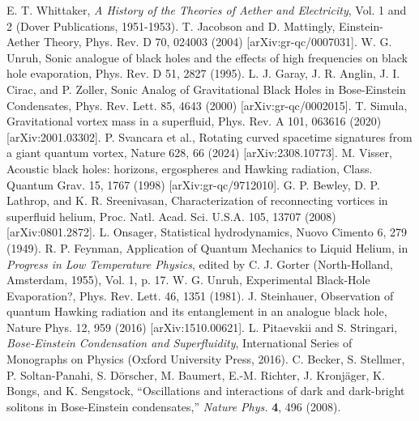 \documentclass{article}
\begin{document}
\begin{thebibliography}{}
 E. T. Whittaker, \emph{A History of the Theories of Aether and Electricity}, Vol. 1 and 2 (Dover Publications, 1951-1953).
 T. Jacobson and D. Mattingly, Einstein-Aether Theory, Phys. Rev. D 70, 024003 (2004) [arXiv:gr-qc/0007031].
 W. G. Unruh, Sonic analogue of black holes and the effects of high frequencies on black hole evaporation, Phys. Rev. D 51, 2827 (1995).
 L. J. Garay, J. R. Anglin, J. I. Cirac, and P. Zoller, Sonic Analog of Gravitational Black Holes in Bose-Einstein Condensates, Phys. Rev. Lett. 85, 4643 (2000) [arXiv:gr-qc/0002015].
 T. Simula, Gravitational vortex mass in a superfluid, Phys. Rev. A 101, 063616 (2020) [arXiv:2001.03302].
 P. Svancara et al., Rotating curved spacetime signatures from a giant quantum vortex, Nature 628, 66 (2024) [arXiv:2308.10773].
 M. Visser, Acoustic black holes: horizons, ergospheres and Hawking radiation, Class. Quantum Grav. 15, 1767 (1998) [arXiv:gr-qc/9712010].
 G. P. Bewley, D. P. Lathrop, and K. R. Sreenivasan, Characterization of reconnecting vortices in superfluid helium, Proc. Natl. Acad. Sci. U.S.A. 105, 13707 (2008) [arXiv:0801.2872].
 L. Onsager, Statistical hydrodynamics, Nuovo Cimento 6, 279 (1949).
 R. P. Feynman, Application of Quantum Mechanics to Liquid Helium, in \emph{Progress in Low Temperature Physics}, edited by C. J. Gorter (North-Holland, Amsterdam, 1955), Vol. 1, p. 17.
 W. G. Unruh, Experimental Black-Hole Evaporation?, Phys. Rev. Lett. 46, 1351 (1981).
 J. Steinhauer, Observation of quantum Hawking radiation and its entanglement in an analogue black hole, Nature Phys. 12, 959 (2016) [arXiv:1510.00621].
 L. Pitaevskii and S. Stringari, \emph{Bose-Einstein Condensation and Superfluidity}, International Series of Monographs on Physics (Oxford University Press, 2016).
 C. Becker, S. Stellmer, P. Soltan-Panahi, S. D\"{o}rscher, M. Baumert, E.-M. Richter, J. Kronj\"{a}ger, K. Bongs, and K. Sengstock, ``Oscillations and interactions of dark and dark-bright solitons in Bose-Einstein condensates,'' \emph{Nature Phys.} \textbf{4}, 496 (2008).
\end{thebibliography}

\begin{thebibliography}{10}


\end{thebibliography}
\end{document}
